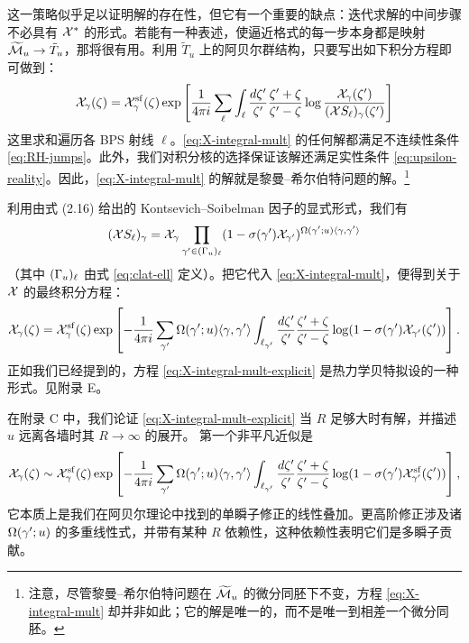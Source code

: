 这一策略似乎足以证明解的存在性，但它有一个重要的缺点：迭代求解的中间步骤不必具有 $\mathcal{X}^*$ 的形式。若能有一种表述，使逼近格式的每一步本身都是映射 $\widetilde{\mathcal{M}}_u\to\tilde T_u$，那将很有用。利用 $\tilde T_u$ 上的阿贝尔群结构，只要写出如下积分方程即可做到：
\begin{equation} \label{eq:X-integral-mult}
\mathcal{X}_\gamma(\zeta) = \mathcal{X}^{\mathrm{sf}}_\gamma(\zeta) \exp \left[ \frac{1}{4 \pi
i}\sum_{\ell} \int_{\ell } \frac{d\zeta'}{\zeta'} \frac{\zeta' +
\zeta}{\zeta' - \zeta} \log \frac {\mathcal{X}_\gamma(\zeta')}{(\mathcal{X} S_\ell)_\gamma(\zeta')}\right]
\end{equation}
这里求和遍历各 BPS 射线 $\ell$。\eqref{eq:X-integral-mult} 的任何解都满足不连续性条件 \eqref{eq:RH-jumps}。此外，我们对积分核的选择保证该解还满足实性条件 \eqref{eq:upsilon-reality}。因此，\eqref{eq:X-integral-mult} 的解就是黎曼--希尔伯特问题的解。\footnote{注意，尽管黎曼--希尔伯特问题在 $\widetilde{\mathcal{M}}_u$ 的微分同胚下不变，方程 \eqref{eq:X-integral-mult} 却并非如此；它的解是唯一的，而不是唯一到相差一个微分同胚。}

利用由式 (2.16) 给出的 Kontsevich--Soibelman 因子的显式形式，我们有 %
\begin{equation}
(\mathcal{X} S_\ell)_\gamma = \mathcal{X}_\gamma \prod_{\gamma' \in (\Gamma_u)_\ell} (1-
\sigma(\gamma') \mathcal{X}_{\gamma'})^{\Omega(\gamma';u)\langle
\gamma,\gamma' \rangle}
\end{equation}
（其中 $(\Gamma_u)_\ell$ 由式 \eqref{eq:clat-ell} 定义）。把它代入 \eqref{eq:X-integral-mult}，便得到关于 $\mathcal{X}$ 的最终积分方程：
\begin{equation} \label{eq:X-integral-mult-explicit}
\mathcal{X}_\gamma(\zeta) = \mathcal{X}^{\mathrm{sf}}_\gamma(\zeta) \exp \left[ -\frac{1}{4
\pi i} \sum_{\gamma'} \Omega(\gamma';u) \langle \gamma,\gamma'
\rangle \int_{\ell_{\gamma'}} \frac{d\zeta'}{\zeta'} \frac{\zeta' +
\zeta}{\zeta' - \zeta} \log (1- \sigma(\gamma')
\mathcal{X}_{\gamma'}(\zeta'))\right].
\end{equation}
正如我们已经提到的，方程 \eqref{eq:X-integral-mult-explicit} 是热力学贝特拟设的一种形式。见附录 E。%

在附录 C 中，我们论证 \eqref{eq:X-integral-mult-explicit} 当 $R$ 足够大时有解，并描述 $u$ 远离各墙时其 $R\to\infty$ 的展开。%
第一个非平凡近似是
\begin{equation} \label{eq:X-first-approx}
\mathcal{X}_\gamma(\zeta) \sim \mathcal{X}^{\mathrm{sf}}_\gamma(\zeta) \exp \left[ -\frac{1}{4
\pi i}  \sum_{\gamma'} \Omega(\gamma';u) \langle \gamma,\gamma'
\rangle \int_{\ell_{\gamma'}} \frac{d\zeta'}{\zeta'} \frac{\zeta' +
\zeta}{\zeta' - \zeta} \log (1- \sigma(\gamma')
\mathcal{X}^{\mathrm{sf}}_{\gamma'}(\zeta'))\right],
\end{equation}
它本质上是我们在阿贝尔理论中找到的单瞬子修正的线性叠加。更高阶修正涉及诸 $\Omega(\gamma';u)$ 的多重线性式，并带有某种 $R$ 依赖性，这种依赖性表明它们是多瞬子贡献。

